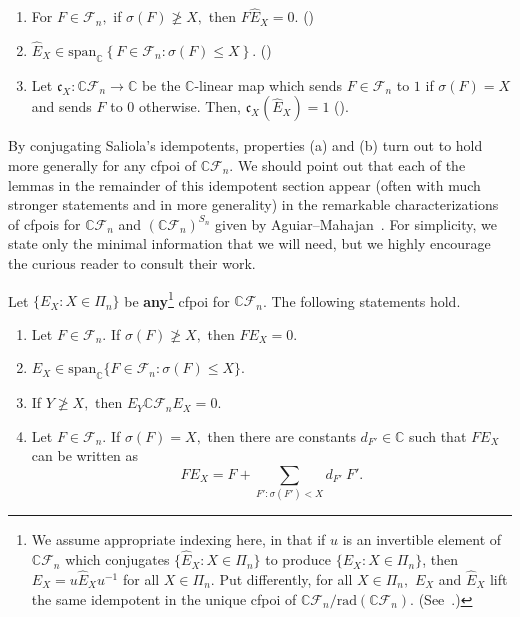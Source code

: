 \documentclass[ALCO, Unicode]{cedram}
\def\rad{\mathrm{rad}}
\def\C{{\mathbb{C}}}
\begin{document}
\begin{enumerate}
    \item[(a)] For $F \in \mathcal{F}_n,$ if $\sigma(F)\ngeq X,$ then $F\widehat{E}_X = 0.$ (\cite[Lemma 5.3]{saliolaquiverdescalgebra})
    \item[(b)]$\widehat{E}_X \in \mathrm{span}_\C \left\{F \in \mathcal{F}_n : \sigma(F) \leq X \right\}.$ (\cite[Theorem 5.2]{saliolaquiverdescalgebra})
    \item[(c)] Let \textbf{$\mathfrak{c}_X: \C \mathcal{F}_n \to \C$} be the $\C$-linear map which sends $F \in \mathcal{F}_n$ to $1$ if $\sigma(F) = X$ and sends $F$ to $0$ otherwise. Then, $\mathfrak{c}_X\left(\widehat{E}_X\right) = 1$ (\cite[Theorem 5.2]{saliolaquiverdescalgebra}).
\end{enumerate}

By conjugating Saliola's idempotents, properties (a) and (b) turn out to hold more generally for {any} cfpoi of $\C \mathcal{F}_n.$ We should point out that each of the lemmas in the remainder of this idempotent section appear (often with much stronger statements and in more generality) in the remarkable characterizations of cfpois for $\C \mathcal{F}_n$ and $\left(\C \mathcal{F}_n \right)^{S_n}$ given by Aguiar--Mahajan~\cite[Chapters 11, 16, Appendix D]{Aguiar-Mahajan}. For simplicity, we state only the minimal information that we will need, but we highly encourage the curious reader to consult their work.

\begin{lemma}
    \label{cor:supports-of-kb-idemps}
    Let $\{E_X: X \in \Pi_n\}$ be \textbf{any}\footnote{We assume appropriate indexing here, in that if $u$ is an invertible element of $\C \mathcal{F}_n$ which conjugates $\{\widehat{E}_X:X \in \Pi_n\}$ to produce $\{E_X: X \in \Pi_n\}$, then $E_X = u\widehat{E}_Xu^{-1}$ for all $X \in \Pi_n.$ Put differently, for all $X \in \Pi_n,$ $E_X$ and $\widehat{E}_X$ lift the same idempotent in the unique cfpoi of $\C \mathcal{F}_n / \rad(\C \mathcal{F}_n).$ (See~\cite[Thm D.33]{Aguiar-Mahajan}.)} cfpoi for $\C \mathcal{F}_n$. The following statements hold. 
    \begin{enumerate}
        \item[(i)] Let $F \in \mathcal{F}_n.$ If $\sigma(F) \ngeq X,$ then $FE_X = 0.$ 
        \item[(ii)]$E_X \in \mathrm{span}_\C \{F \in \mathcal{F}_n: \sigma(F) \leq X\}$. 
        \item[(iii)]  If $Y \ngeq X,$ then $E_Y\C \mathcal{F}_nE_X = 0.$ 
        \item[(iv)] Let $F \in \mathcal{F}_n.$ If $\sigma(F) = X,$ then there are constants $d_{F'} \in \C$ such that $F E_X$ can be written as \[F E_X = F + \sum_{F': \sigma(F') < X}d_{F'} \ F'.\] 
    \end{enumerate}
\end{lemma}
\end{document}
